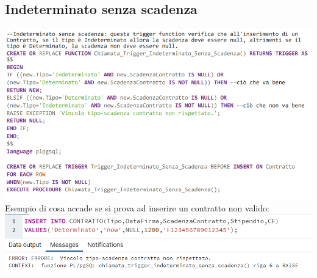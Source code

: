 \subsection{Indeterminato senza scadenza}
\includegraphics[width=1.2\textwidth]{Immagini/vincolo1.sql}
Esempio di cosa accade se si prova ad inserire un contratto non valido:
\newline\newline
\includegraphics[width=1.2\textwidth]{Immagini/vincolo1}

